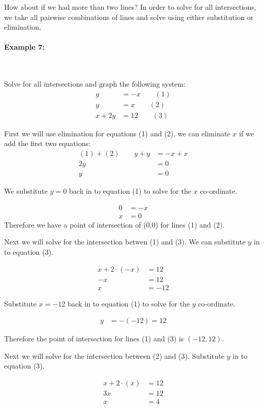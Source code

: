 \documentclass[english,12pt]{article}
\theoremstyle{plain}
\theoremstyle{definition}
\theoremstyle{definition} %
\begin{document}
How about if we had more than two lines?  In order to solve for all intersections, we take all pairwise combinations of lines and solve using either substitution or elimination.

\paragraph{Example 7:}\

Solve for all intersections and graph the following system:
\begin{align*}
y&=-x\qquad (1)\\
y&=x\qquad (2)\\
x+2y&=12\qquad (3)
\end{align*}

First we will use elimination for equations (1) and (2), we can eliminate $x$ if we add the first two equations:
\begin{align*}
(1)+(2)\qquad y+y&=-x+x\\
2y&=0\\
y&=0
\end{align*}

We substitute $y=0$ back in to equation (1) to solve for the $x$ co-ordinate.

\begin{align*}
0&=-x\\
x&=0
\end{align*}
Therefore we have a point of intersection of (0,0) for lines (1) and (2).

Next we will solve for the intersection betwen (1) and (3).  We can substitute $y$ in to equation (3).

\begin{align*}
x+2\cdot (-x)&= 12\\
-x&=12\\
x&=-12
\end{align*} 

Substitute $x=-12$ back in to equation (1) to solve for the $y$ co-ordinate.

\begin{align*}
y&=-(-12)
=12
\end{align*}

Therefore the point of intersection for lines (1) and (3) is $(-12,12)$.

Next we will solve for the intersection between (2) and (3).  Substitute $y$ in to equation (3).

\begin{align*}
x+2\cdot(x)&=12\\
3x&=12\\
x&=4
\end{align*}
\end{document}
